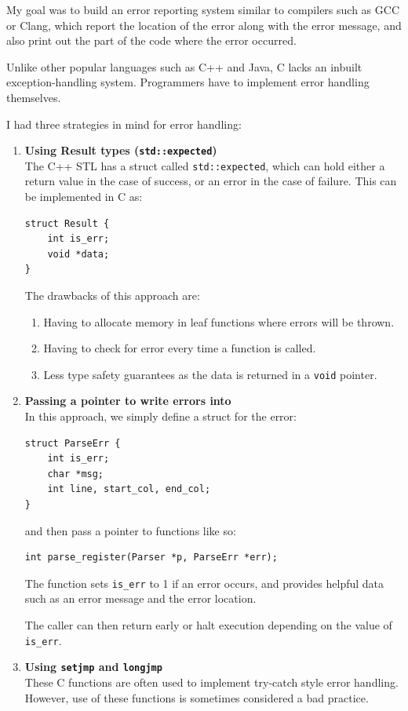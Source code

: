 \documentclass{article}
\begin{document}
My goal was to build an error reporting system similar to compilers such as GCC or Clang,
which report the location of the error along with the error message, and also print out 
the part of the code where the error occurred.

Unlike other popular languages such as C++ and Java, C lacks an inbuilt exception-handling
system. Programmers have to implement error handling themselves.

I had three strategies in mind for error handling:

\begin{enumerate}
    \item \textbf{Using Result types (\texttt{std::expected})} \\
        The C++ STL has a struct called \texttt{std::expected}, which can
        hold either a return value in the case of success, or an error in
        the case of failure. This can be implemented in C as:
        \begin{verbatim}
struct Result {
    int is_err;
    void *data;
}\end{verbatim}
        The drawbacks of this approach are:
        \begin{enumerate}
            \item Having to allocate memory in leaf functions where
                errors will be thrown.
            \item Having to check for error every time a function is called.
            \item Less type safety guarantees as the data is returned
                in a \texttt{void} pointer.
        \end{enumerate}

    \item \textbf{Passing a pointer to write errors into} \\
        In this approach, we simply define a struct for the error:
        \begin{verbatim}
struct ParseErr {
    int is_err;
    char *msg;
    int line, start_col, end_col;
}\end{verbatim}
        and then pass a pointer to functions like so:
        \begin{verbatim}
int parse_register(Parser *p, ParseErr *err);\end{verbatim}
        The function sets \texttt{is\_err} to 1 if an error
        occurs, and provides helpful data such as an error
        message and the error location.

        The caller can then return early or halt execution
        depending on the value of \texttt{is\_err}.
    \item \textbf{Using \texttt{setjmp} and \texttt{longjmp}} \\
        These C functions are often used to implement try-catch style error
        handling. However, use of these functions is sometimes considered
        a bad practice.
\end{enumerate}
\end{document}
